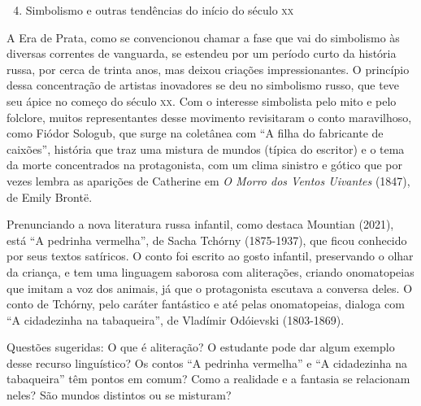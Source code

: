\documentclass[11pt]{extarticle}
\begin{document}
\begin{enumerate}
\setcounter{enumi}{3}
\item Simbolismo e outras tendências do início do século \textsc{xx}
\end{enumerate}

A Era de Prata, como se convencionou chamar a fase que vai do
simbolismo às diversas correntes de vanguarda, se estendeu por um
período curto da história russa, por cerca de trinta anos, mas deixou
criações impressionantes. O princípio dessa concentração de artistas
inovadores se deu no simbolismo russo, que teve seu ápice no começo do
século \textsc{xx}. Com o interesse simbolista pelo mito e pelo folclore, muitos
representantes desse movimento revisitaram o conto maravilhoso, como
Fiódor Sologub, que surge na coletânea com ``A filha do fabricante de
caixões'', história que traz uma mistura de mundos (típica do
escritor) e o tema da morte concentrados na protagonista, com um clima
sinistro e gótico que por vezes lembra as aparições de Catherine em
\emph{O Morro dos Ventos Uivantes} (1847), de Emily Brontë.

Prenunciando a nova literatura russa infantil, como destaca Mountian
(2021), está ``A pedrinha vermelha'', de Sacha Tchórny (1875-1937), que
ficou conhecido por seus textos satíricos. O conto foi escrito ao gosto
infantil, preservando o olhar da criança, e tem uma linguagem saborosa
com aliterações, criando onomatopeias que imitam a voz dos animais, já
que o protagonista escutava a conversa deles. O conto de Tchórny, pelo
caráter fantástico e até pelas onomatopeias, dialoga com ``A cidadezinha
na tabaqueira'', de Vladímir Odóievski (1803-1869).

\begin{figure}[ht!]
\end{figure}

Questões sugeridas: O que é aliteração? O estudante pode dar algum
exemplo desse recurso linguístico? Os contos ``A pedrinha vermelha'' e
``A cidadezinha na tabaqueira'' têm pontos em comum? Como a realidade e
a fantasia se relacionam neles? São mundos distintos ou se misturam?
\end{document}
